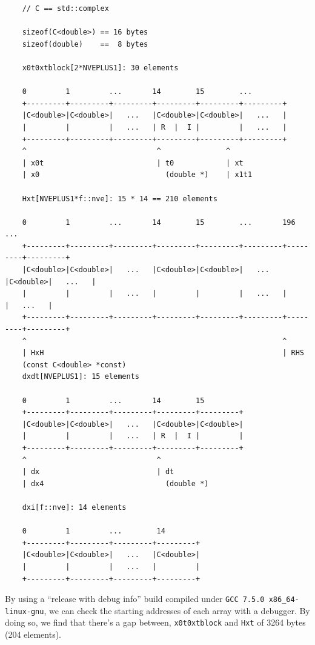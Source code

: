 \tiny\begin{verbatim}
    // C == std::complex

    sizeof(C<double>) == 16 bytes
    sizeof(double)    ==  8 bytes

    x0t0xtblock[2*NVEPLUS1]: 30 elements

    0         1         ...       14        15        ...
    +---------+---------+---------+---------+---------+---------+
    |C<double>|C<double>|   ...   |C<double>|C<double>|   ...   |
    |         |         |   ...   | R  |  I |         |   ...   |
    +---------+---------+---------+---------+---------+---------+
    ^                              ^               ^
    | x0t                          | t0            | xt
    | x0                             (double *)    | x1t1

    Hxt[NVEPLUS1*f::nve]: 15 * 14 == 210 elements

    0         1         ...       14        15        ...       196       ...
    +---------+---------+---------+---------+---------+---------+---------+---------+
    |C<double>|C<double>|   ...   |C<double>|C<double>|   ...   |C<double>|   ...   |
    |         |         |   ...   |         |         |   ...   |         |   ...   |
    +---------+---------+---------+---------+---------+---------+---------+---------+
    ^                                                           ^
    | HxH                                                       | RHS
    (const C<double> *const)
    dxdt[NVEPLUS1]: 15 elements

    0         1         ...       14        15
    +---------+---------+---------+---------+---------+
    |C<double>|C<double>|   ...   |C<double>|C<double>|
    |         |         |   ...   | R  |  I |         |
    +---------+---------+---------+---------+---------+
    ^                              ^
    | dx                           | dt
    | dx4                            (double *)

    dxi[f::nve]: 14 elements

    0         1         ...        14
    +---------+---------+---------+---------+
    |C<double>|C<double>|   ...   |C<double>|
    |         |         |   ...   |         |
    +---------+---------+---------+---------+

\end{verbatim}
\normalsize

By using a ``release with debug info'' build compiled under
\verb|GCC 7.5.0 x86_64-linux-gnu|, we can check the starting addresses of
each array with a debugger. By doing so, we find that there's a gap between,
\verb|x0t0xtblock| and \verb|Hxt| of 3264 bytes (204 elements).

